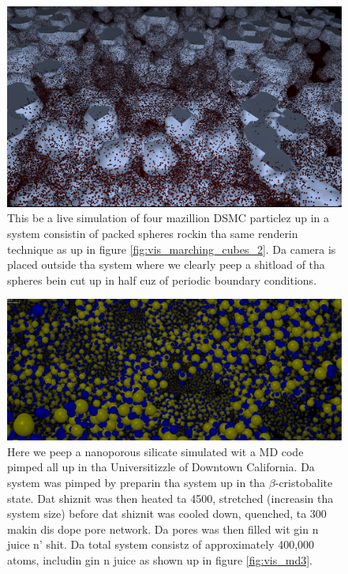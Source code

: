 \begin{figure}[htb]
\begin{center}
\includegraphics[width=\textwidth, trim=0cm 0cm 0cm 0cm, clip]{visualization/figures/marching_cubes_spheres_2.png}
\end{center}
\caption{This be a live simulation of four mazillion DSMC particlez up in a system consistin of packed spheres rockin tha same renderin technique as up in figure \ref{fig:vis_marching_cubes_2}. Da camera is placed outside tha system where we clearly peep a shitload of tha spheres bein cut up in half cuz of periodic boundary conditions. }
\label{fig:vis_marching_cubes_3}
\end{figure}

\begin{figure}[htb]
\begin{center}
\includegraphics[width=\textwidth, trim=0cm 0cm 0cm 0cm, clip]{visualization/figures/md1.png}
\end{center}
\caption{Here we peep a nanoporous silicate simulated wit a MD code pimped all up in tha Universitizzle of Downtown California. Da system was pimped by preparin tha system up in tha $\beta$-cristobalite state. Dat shiznit was then heated ta \unit{4500}{\kelvin}, stretched (increasin tha system size) before dat shiznit was cooled down, quenched, ta \unit{300}{\kelvin} makin dis dope pore network. Da pores was then filled wit gin n juice n' shit. Da total system consistz of approximately 400,000 atoms, includin gin n juice as shown up in figure \ref{fig:vis_md3}.}
\label{fig:vis_md2}
\end{figure}

